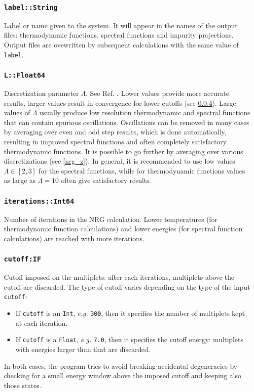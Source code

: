 \documentclass[notitlepage]{article}
\begin{document}
\subsubsection{\texttt{label::String}}
\label{nrg_label}
Label or name given to the system. It will appear in the
names of the output files: thermodynamic functions, spectral
functions and impurity projections. Output files are
ovewritten by subsequent calculations with the same value of
\texttt{label}.

\subsubsection{\texttt{L::Float64}}
\label{nrg_L}
Discretization parameter $\Lambda$. See Ref. \cite{bulla2008}.
Lower values provide more accurate results, larger values
result in convergence for lower cutoffs (see
\ref{nrg_cutoff}). Large values of $\Lambda$ usually produce
low resolution thermodynamic and spectral functions that can
contain spurious oscillations. Oscillations can be removed
in many cases by averaging over even and odd step results,
which is done automatically, resulting in improved spectral
functions and often completely satisfactory thermodynamic
functions. It is possible to go further by averaging over
various discretizations (see \ref{nrg_z}). In general,
it is recommended to use low values $\Lambda\in[2,3]$ for the spectral
functions, while for thermodynamic functions values as large
as $\Lambda=10$ often give satisfactory results.

\subsubsection{\texttt{iterations::Int64}}
\label{nrg_iterations}
Number of iterations in the NRG calculation. Lower
temperatures (for thermodynamic function calculations) and
lower energies (for spectral function calculations) are
reached with more iterations.

\subsubsection{\texttt{cutoff:IF}}
\label{nrg_cutoff}
Cutoff imposed on the multiplets: after each iterations,
multiplets above the cutoff are discarded. The type of
cutoff varies depending on the type of the input
\texttt{cutoff}:
\begin{itemize}
    \item If \texttt{cutoff} is an \texttt{Int},
    \textit{e.g.} \texttt{300}, then it
    specifies the number of multiplets kept at each
    iteration.
    \item If \texttt{cutoff} is a \texttt{Float},
    \textit{e.g.} \texttt{7.0}, then it
    specifies the cutoff energy: multiplets with energies
    larger than that are discarded.
\end{itemize}
In both cases, the program tries to avoid breaking
accidental degeneracies by checking for a small energy
window above the imposed cutoff and keeping also those
states.
\end{document}
